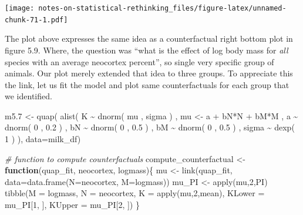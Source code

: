 \documentclass[
]{book}
\newenvironment{Shaded}{\begin{snugshade}}{\end{snugshade}}
\newcommand{\AttributeTok}[1]{\textcolor[rgb]{0.77,0.63,0.00}{#1}}
\newcommand{\CommentTok}[1]{\textcolor[rgb]{0.56,0.35,0.01}{\textit{#1}}}
\newcommand{\ControlFlowTok}[1]{\textcolor[rgb]{0.13,0.29,0.53}{\textbf{#1}}}
\newcommand{\DecValTok}[1]{\textcolor[rgb]{0.00,0.00,0.81}{#1}}
\newcommand{\FloatTok}[1]{\textcolor[rgb]{0.00,0.00,0.81}{#1}}
\newcommand{\FunctionTok}[1]{\textcolor[rgb]{0.00,0.00,0.00}{#1}}
\newcommand{\NormalTok}[1]{#1}
\newcommand{\OtherTok}[1]{\textcolor[rgb]{0.56,0.35,0.01}{#1}}
\newcommand{\SpecialCharTok}[1]{\textcolor[rgb]{0.00,0.00,0.00}{#1}}
\begin{document}
\texttt{[image: notes-on-statistical-rethinking\_files/figure-latex/unnamed-chunk-71-1.pdf]}

The plot above expresses the same idea as a counterfactual right bottom plot in figure 5.9. Where, the question was ``what is the effect of log body mass for \emph{all} species with an average neocortex percent'', so single very specific group of animals. Our plot merely extended that idea to three groups. To appreciate this the link, let us fit the model and plot same counterfactuals for each group that we identified.

\begin{Shaded}
\begin{Highlighting}[]
\NormalTok{m5}\FloatTok{.7} \OtherTok{\textless{}{-}} \FunctionTok{quap}\NormalTok{(}
  \FunctionTok{alist}\NormalTok{(}
\NormalTok{    K }\SpecialCharTok{\textasciitilde{}} \FunctionTok{dnorm}\NormalTok{( mu , sigma ) ,}
\NormalTok{    mu }\OtherTok{\textless{}{-}}\NormalTok{ a }\SpecialCharTok{+}\NormalTok{ bN}\SpecialCharTok{*}\NormalTok{N }\SpecialCharTok{+}\NormalTok{ bM}\SpecialCharTok{*}\NormalTok{M ,}
\NormalTok{    a }\SpecialCharTok{\textasciitilde{}} \FunctionTok{dnorm}\NormalTok{( }\DecValTok{0}\NormalTok{ , }\FloatTok{0.2}\NormalTok{ ) ,}
\NormalTok{    bN }\SpecialCharTok{\textasciitilde{}} \FunctionTok{dnorm}\NormalTok{( }\DecValTok{0}\NormalTok{ , }\FloatTok{0.5}\NormalTok{ ) ,}
\NormalTok{    bM }\SpecialCharTok{\textasciitilde{}} \FunctionTok{dnorm}\NormalTok{( }\DecValTok{0}\NormalTok{ , }\FloatTok{0.5}\NormalTok{ ) ,}
\NormalTok{    sigma }\SpecialCharTok{\textasciitilde{}} \FunctionTok{dexp}\NormalTok{( }\DecValTok{1}\NormalTok{ )}
\NormalTok{  ),}
  \AttributeTok{data=}\NormalTok{milk\_df)}


\CommentTok{\# function to compute counterfactuals}
\NormalTok{compute\_counterfactual }\OtherTok{\textless{}{-}} \ControlFlowTok{function}\NormalTok{(quap\_fit, neocortex, logmass)\{}
\NormalTok{  mu }\OtherTok{\textless{}{-}} \FunctionTok{link}\NormalTok{(quap\_fit, }\AttributeTok{data=}\FunctionTok{data.frame}\NormalTok{(}\AttributeTok{N=}\NormalTok{neocortex, }\AttributeTok{M=}\NormalTok{logmass))}
\NormalTok{  mu\_PI }\OtherTok{\textless{}{-}} \FunctionTok{apply}\NormalTok{(mu,}\DecValTok{2}\NormalTok{,PI)}
  \FunctionTok{tibble}\NormalTok{(}\AttributeTok{M =}\NormalTok{ logmass,}
         \AttributeTok{N =}\NormalTok{ neocortex,}
         \AttributeTok{K =} \FunctionTok{apply}\NormalTok{(mu,}\DecValTok{2}\NormalTok{,mean),}
         \AttributeTok{KLower =}\NormalTok{ mu\_PI[}\DecValTok{1}\NormalTok{, ],}
         \AttributeTok{KUpper =}\NormalTok{ mu\_PI[}\DecValTok{2}\NormalTok{, ])}
\NormalTok{\}}




\end{Highlighting}
\end{Shaded}
\end{document}
